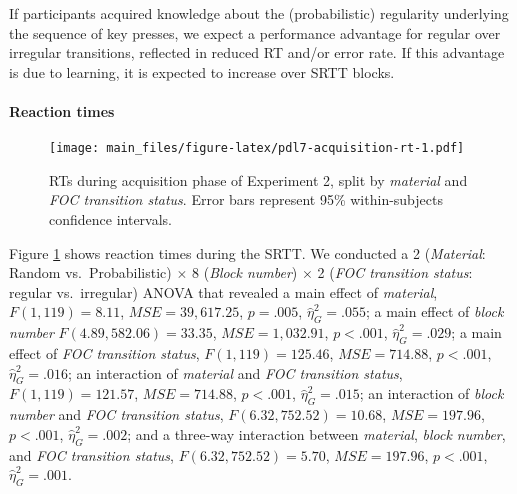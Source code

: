\documentclass[english,,man]{apa6}
\begin{document}
If participants acquired knowledge about the (probabilistic) regularity underlying the sequence of key presses, we expect a performance advantage for regular over irregular transitions, reflected in reduced RT and/or error rate.
If this advantage is due to learning, it is expected to increase over SRTT blocks.

\hypertarget{reaction-times-1}{%
\paragraph{Reaction times}\label{reaction-times-1}}

\begin{figure}
\centering
\texttt{[image: main\_files/figure-latex/pdl7-acquisition-rt-1.pdf]}
\caption{\label{fig:pdl7-acquisition-rt}RTs during acquisition phase of Experiment 2, split by \emph{material} and \emph{FOC transition status}. Error bars represent 95\% within-subjects confidence intervals.}
\end{figure}

Figure \ref{fig:pdl7-acquisition-rt} shows reaction times during the SRTT.
We conducted a 2 (\emph{Material}: Random vs.~Probabilistic) \(\times\) 8 (\emph{Block number}) \(\times\) 2 (\emph{FOC transition status}: regular vs.~irregular) ANOVA that revealed
a main effect of \emph{material},
\(F(1, 119) = 8.11\), \(\mathit{MSE} = 39,617.25\), \(p = .005\), \(\hat{\eta}^2_G = .055\);
a main effect of \emph{block number}
\(F(4.89, 582.06) = 33.35\), \(\mathit{MSE} = 1,032.91\), \(p < .001\), \(\hat{\eta}^2_G = .029\);
a main effect of \emph{FOC transition status},
\(F(1, 119) = 125.46\), \(\mathit{MSE} = 714.88\), \(p < .001\), \(\hat{\eta}^2_G = .016\);
an interaction of \emph{material} and \emph{FOC transition status},
\(F(1, 119) = 121.57\), \(\mathit{MSE} = 714.88\), \(p < .001\), \(\hat{\eta}^2_G = .015\);
an interaction of \emph{block number} and \emph{FOC transition status},
\(F(6.32, 752.52) = 10.68\), \(\mathit{MSE} = 197.96\), \(p < .001\), \(\hat{\eta}^2_G = .002\);
and a three-way interaction between \emph{material}, \emph{block number}, and \emph{FOC transition status},
\(F(6.32, 752.52) = 5.70\), \(\mathit{MSE} = 197.96\), \(p < .001\), \(\hat{\eta}^2_G = .001\).
\end{document}
